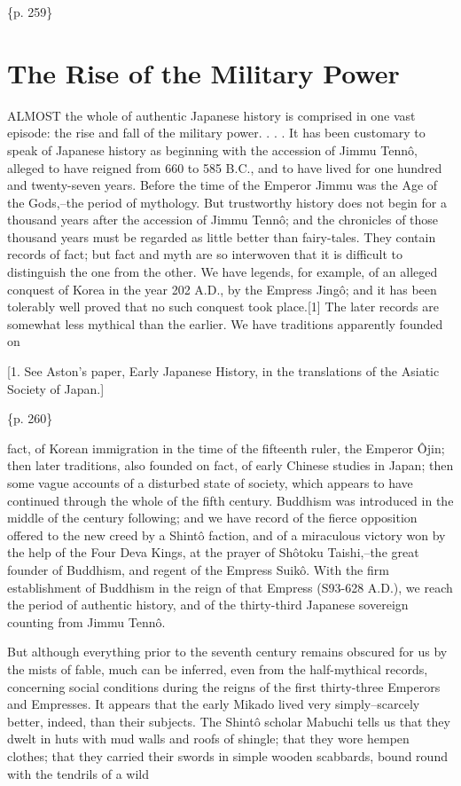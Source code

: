 \{p. 259\}

\section{The Rise of the Military Power}
\label{sec:orgbde8a38}

ALMOST the whole of authentic Japanese history is comprised in one vast episode: the rise and fall of the military power. . . . It has been customary to speak of Japanese history as beginning with the accession of Jimmu Tennô, alleged to have reigned from 660 to 585 B.C., and to have lived for one hundred and twenty-seven years. Before the time of the Emperor Jimmu was the Age of the Gods,--the period of mythology. But trustworthy history does not begin for a thousand years after the accession of Jimmu Tennô; and the chronicles of those thousand years must be regarded as little better than fairy-tales. They contain records of fact; but fact and myth are so interwoven that it is difficult to distinguish the one from the other. We have legends, for example, of an alleged conquest of Korea in the year 202 A.D., by the Empress Jingô; and it has been tolerably well proved that no such conquest took place.[1] The later records are somewhat less mythical than the earlier. We have traditions apparently founded on

[1. See Aston's paper, Early Japanese History, in the translations of the Asiatic Society of Japan.]

\{p. 260\}

fact, of Korean immigration in the time of the fifteenth ruler, the Emperor Ôjin; then later traditions, also founded on fact, of early Chinese studies in Japan; then some vague accounts of a disturbed state of society, which appears to have continued through the whole of the fifth century. Buddhism was introduced in the middle of the century following; and we have record of the fierce opposition offered to the new creed by a Shintô faction, and of a miraculous victory won by the help of the Four Deva Kings, at the prayer of Shôtoku Taishi,--the great founder of Buddhism, and regent of the Empress Suikô. With the firm establishment of Buddhism in the reign of that Empress (S93-628 A.D.), we reach the period of authentic history, and of the thirty-third Japanese sovereign counting from Jimmu Tennô.

But although everything prior to the seventh century remains obscured for us by the mists of fable, much can be inferred, even from the half-mythical records, concerning social conditions during the reigns of the first thirty-three Emperors and Empresses. It appears that the early Mikado lived very simply--scarcely better, indeed, than their subjects. The Shintô scholar Mabuchi tells us that they dwelt in huts with mud walls and roofs of shingle; that they wore hempen clothes; that they carried their swords in simple wooden scabbards, bound round with the tendrils of a wild

